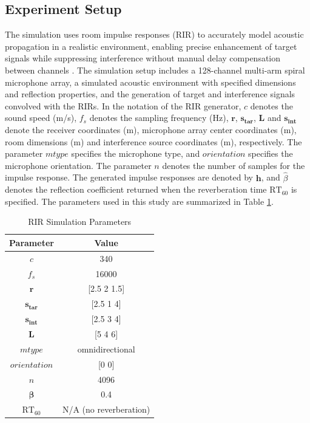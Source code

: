 \documentclass[journal]{IEEEtran}
\begin{document}
\subsection{Experiment Setup}
The simulation uses room impulse responses (RIR) to accurately model acoustic propagation in a realistic environment, enabling precise enhancement of target signals while suppressing interference without manual delay compensation between channels \cite{habetsRoomImpulseResponse2006}. The simulation setup includes a 128-channel multi-arm spiral microphone array, a simulated acoustic environment with specified dimensions and reflection properties, and the generation of target and interference signals convolved with the RIRs. In the notation of the RIR generator, $c$ denotes the sound speed (m/s), $f_s$ denotes the sampling frequency (Hz), $\boldsymbol{r}$, $\boldsymbol{s_{\text{tar}}}$, $\boldsymbol{L}$ and $\boldsymbol{s_{\text{int}}}$ denote the receiver coordinates (m), microphone array center coordinates (m), room dimensions (m) and interference source coordinates (m), respectively. The parameter $mtype$ specifies the microphone type, and $orientation$ specifies the microphone orientation. The parameter $n$ denotes the number of samples for the impulse response. The generated impulse responses are denoted by $\boldsymbol{h}$, and $\hat{\beta}$ denotes the reflection coefficient returned when the reverberation time $\mathrm{RT}_{60}$ is specified. The parameters used in this study are summarized in Table \ref{tab:rir_parameters}.
\begin{table}[htbp]
\centering
\caption{RIR Simulation Parameters}
\label{tab:rir_parameters}
\begin{tabular}{cc}
\hline
\textbf{Parameter} & \textbf{Value} \\
\hline
$c$ & 340  \\
$f_s$ & 16000 \\
$\boldsymbol{r}$ & [2.5 2 1.5] \\
$\boldsymbol{s_{\text{tar}}}$& [2.5 1 4] \\
$\boldsymbol{s_{\text{int}}}$& [2.5 3 4] \\
$\boldsymbol{L}$ &  [5 4 6]  \\
$mtype$ & omnidirectional \\
$orientation$ & [0 0] \\
$n$ & 4096 \\
$\boldsymbol{\beta}$ & 0.4 \\
$\mathrm{RT}_{60}$ & N/A (no reverberation) \\
\hline
\end{tabular}
\end{table}
\end{document}
